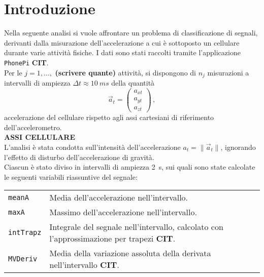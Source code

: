 \documentclass[./main.tex]{subfiles}
\begin{document}
\section{Introduzione}
Nella seguente analisi si vuole affrontare un problema di classificazione di segnali, derivanti dalla misurazione dell'accelerazione a cui è sottoposto un cellulare durante varie attività fisiche. I dati sono stati raccolti tramite l'applicazione \texttt{PhonePi} \textbf{CIT}.\\
Per le $j = 1, \ldots, $ \textbf{(scrivere quante)} attività, si dispongono di $n_j$ misurazioni a intervalli di ampiezza $\Delta t \approx \SI{10}{ms}$ della quantità
$$
\vec{a}_t = \begin{pmatrix}
a_{xt}\\
a_{yt}\\
a_{zt}
\end{pmatrix}\,,
$$
accelerazione del cellulare rispetto agli assi cartesiani di riferimento dell'accelerometro.\\
\textbf{ASSI CELLULARE}\\
L'analisi è stata condotta sull'intensità dell'accelerazione $a_t = \|\vec{a}_t\|$, ignorando l'effetto di disturbo dell'accelerazione di gravità.\\
Ciascun  è stato diviso in intervalli di ampiezza \SI{2}{s}, sui quali sono state calcolate le seguenti variabili riassuntive del segnale:
\begin{table}[H]
	\begin{tabular}{ll}
		\texttt{meanA}& Media dell'accelerazione nell'intervallo.\\
		\texttt{maxA}&Massimo dell'accelerazione nell'intervallo.\\
		\texttt{intTrapz}&Integrale del segnale nell'intervallo, calcolato con l'approssimazione per trapezi \textbf{CIT}.\\
		\texttt{MVDeriv}&Media della variazione assoluta della derivata nell'intervallo \textbf{CIT}.
	\end{tabular}
\end{table}
\end{document}
